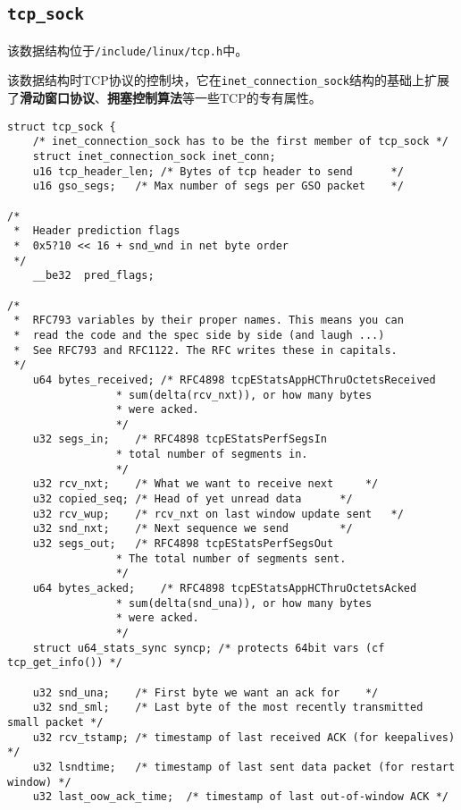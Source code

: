         \subsection{\texttt{tcp_sock}}

            该数据结构位于\texttt{/include/linux/tcp.h}中。

            该数据结构时TCP协议的控制块，它在\texttt{inet_connection_sock}结构的基础上扩展了\textbf{滑动窗口协议}、\textbf{拥塞控制算法}等一些TCP的专有属性。
            
\begin{verbatim}
struct tcp_sock {
    /* inet_connection_sock has to be the first member of tcp_sock */
    struct inet_connection_sock inet_conn;
    u16 tcp_header_len; /* Bytes of tcp header to send      */
    u16 gso_segs;   /* Max number of segs per GSO packet    */

/*
 *  Header prediction flags
 *  0x5?10 << 16 + snd_wnd in net byte order
 */
    __be32  pred_flags;

/*
 *  RFC793 variables by their proper names. This means you can
 *  read the code and the spec side by side (and laugh ...)
 *  See RFC793 and RFC1122. The RFC writes these in capitals.
 */
    u64 bytes_received; /* RFC4898 tcpEStatsAppHCThruOctetsReceived
                 * sum(delta(rcv_nxt)), or how many bytes
                 * were acked.
                 */
    u32 segs_in;    /* RFC4898 tcpEStatsPerfSegsIn
                 * total number of segments in.
                 */
    u32 rcv_nxt;    /* What we want to receive next     */
    u32 copied_seq; /* Head of yet unread data      */
    u32 rcv_wup;    /* rcv_nxt on last window update sent   */
    u32 snd_nxt;    /* Next sequence we send        */
    u32 segs_out;   /* RFC4898 tcpEStatsPerfSegsOut
                 * The total number of segments sent.
                 */
    u64 bytes_acked;    /* RFC4898 tcpEStatsAppHCThruOctetsAcked
                 * sum(delta(snd_una)), or how many bytes
                 * were acked.
                 */
    struct u64_stats_sync syncp; /* protects 64bit vars (cf tcp_get_info()) */

    u32 snd_una;    /* First byte we want an ack for    */
    u32 snd_sml;    /* Last byte of the most recently transmitted small packet */
    u32 rcv_tstamp; /* timestamp of last received ACK (for keepalives) */
    u32 lsndtime;   /* timestamp of last sent data packet (for restart window) */
    u32 last_oow_ack_time;  /* timestamp of last out-of-window ACK */


\end{verbatim}
